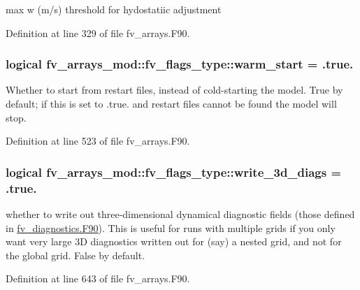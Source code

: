 max w (m/s) threshold for hydostatiic adjustment 



Definition at line 329 of file fv\-\_\-arrays.\-F90.

\subsubsection[{warm\-\_\-start}]{\setlength{\rightskip}{0pt plus 5cm}logical fv\-\_\-arrays\-\_\-mod\-::fv\-\_\-flags\-\_\-type\-::warm\-\_\-start = .true.}\label{structfv__arrays__mod_1_1fv__flags__type_a213ea7debdf2b2feb97c44dd606818a5}


Whether to start from restart files, instead of cold-\/starting the model. True by default; if this is set to .true. and restart files cannot be found the model will stop. 



Definition at line 523 of file fv\-\_\-arrays.\-F90.

\subsubsection[{write\-\_\-3d\-\_\-diags}]{\setlength{\rightskip}{0pt plus 5cm}logical fv\-\_\-arrays\-\_\-mod\-::fv\-\_\-flags\-\_\-type\-::write\-\_\-3d\-\_\-diags = .true.}\label{structfv__arrays__mod_1_1fv__flags__type_a1cb6e1fb7a4269f6ee15957997f5f310}


whether to write out three-\/dimensional dynamical diagnostic fields (those defined in \hyperlink{fv__diagnostics_8F90}{fv\-\_\-diagnostics.\-F90}). This is useful for runs with multiple grids if you only want very large 3\-D diagnostics written out for (say) a nested grid, and not for the global grid. False by default. 



Definition at line 643 of file fv\-\_\-arrays.\-F90.

